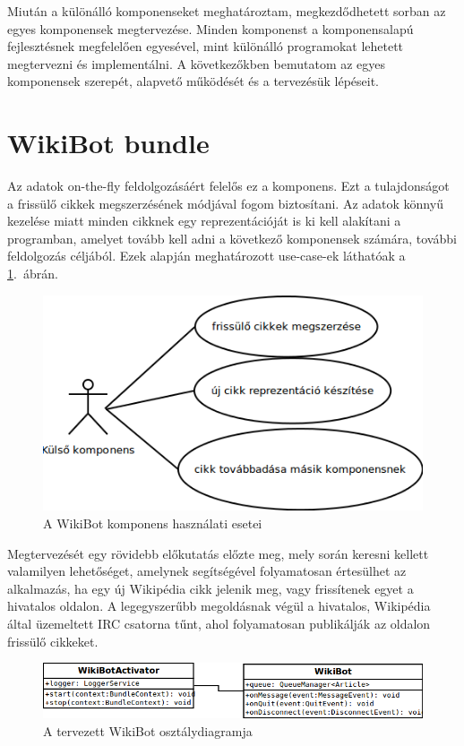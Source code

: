 Miután a különálló komponenseket meghatároztam, megkezdődhetett sorban az egyes komponensek megtervezése. Minden komponenst a komponensalapú fejlesztésnek megfelelően egyesével, mint különálló programokat lehetett megtervezni és implementálni. A következőkben bemutatom az egyes komponensek szerepét, alapvető működését és a tervezésük lépéseit.

\section{WikiBot bundle}
\label{sec:wikibotbundle}

Az adatok on-the-fly feldolgozásáért felelős ez a komponens. Ezt a tulajdonságot a frissülő cikkek megszerzésének módjával fogom biztosítani. Az adatok könnyű kezelése miatt minden cikknek egy reprezentációját is ki kell alakítani a programban, amelyet tovább kell adni a következő komponensek számára, további feldolgozás céljából. Ezek alapján meghatározott use-case-ek láthatóak a \ref{fig:usecase_wikiBot}.~ábrán.

\begin{figure}[htp]
\centering
\includegraphics[scale=0.6]{img/usecase_wikiBot}
\caption{A WikiBot komponens használati esetei}
\label{fig:usecase_wikiBot}
\end{figure}

Megtervezését egy rövidebb előkutatás előzte meg, mely során keresni kellett valamilyen lehetőséget, amelynek segítségével folyamatosan értesülhet az alkalmazás, ha egy új Wikipédia cikk jelenik meg, vagy frissítenek egyet a hivatalos oldalon. A legegyszerűbb megoldásnak végül a hivatalos, Wikipédia által üzemeltett IRC csatorna tűnt, ahol folyamatosan publikálják az oldalon frissülő cikkeket.

\begin{figure}[htp]
\centering
\includegraphics[scale=0.55]{img/class_wikiBot}
\caption{A tervezett WikiBot osztálydiagramja}
\label{fig:class_wikiBot}
\end{figure}

